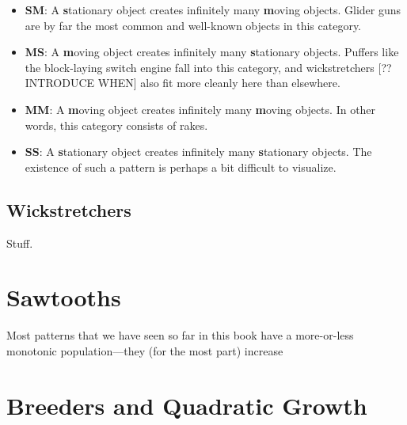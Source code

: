 \begin{itemize}
	\item \textbf{SM}: A \textbf{s}tationary object creates infinitely many \textbf{m}oving objects. Glider guns are by far the most common and well-known objects in this category.
	
	\item \textbf{MS}: A \textbf{m}oving object creates infinitely many \textbf{s}tationary objects. Puffers like the block-laying switch engine fall into this category, and wickstretchers [?? INTRODUCE WHEN] also fit more cleanly here than elsewhere.
	
	\item \textbf{MM}: A \textbf{m}oving object creates infinitely many \textbf{m}oving objects. In other words, this category consists of rakes.
	
	\item \textbf{SS}: A \textbf{s}tationary object creates infinitely many \textbf{s}tationary objects. The existence of such a pattern is perhaps a bit difficult to visualize.
\end{itemize}



\subsection{Wickstretchers}\label{sec:wickstretchers}

Stuff.


\section{Sawtooths}\label{sec:sawtooths}

Most patterns that we have seen so far in this book have a more-or-less monotonic population---they (for the most part) increase



\section{Breeders and Quadratic Growth}\label{sec:breeders}

